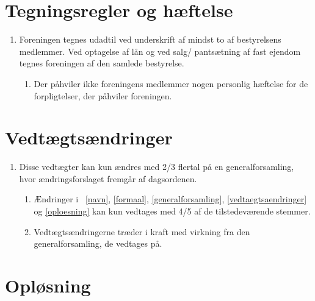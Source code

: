 \documentclass[a4paper]{article}
\newenvironment{stykenum}{
  \begin{enumerate}[%
    label=Stk.~\arabic*., ref=\textsection~\theenumi~Stk.~\arabic*, start=2]
}{\end{enumerate}}
\begin{document}
\section*{Tegningsregler og hæftelse}

\begin{enumerate}[resume*=afsnit]

\item Foreningen tegnes udadtil ved underskrift af mindst to af bestyrelsens
medlemmer. Ved optagelse af lån og ved salg/ pantsætning af fast ejendom tegnes
foreningen af den samlede bestyrelse.

  \begin{stykenum}

  \item Der påhviler ikke foreningens medlemmer nogen personlig hæftelse for de
        forpligtelser, der påhviler foreningen.

  \end{stykenum}

\end{enumerate}


\section*{Vedtægtsændringer}

\begin{enumerate}[resume*=afsnit]

\item \label{vedtaegtsaendringer} Disse vedtægter kan kun ændres med 2/3
flertal på en generalforsamling, hvor ændringsforslaget fremgår af dagsordenen.

  \begin{stykenum}

  \item Ændringer i \textsection\textsection~\ref{navn}, \ref{formaal},
        \ref{generalforsamling}, \ref{vedtaegtsaendringer} og \ref{oploesning}
        kan kun vedtages med 4/5 af de tilstedeværende stemmer.

  \item Vedtægtsændringerne træder i kraft med virkning fra den
        generalforsamling, de vedtages på.

  \end{stykenum}

\end{enumerate}


\section*{Opløsning}
\end{document}
